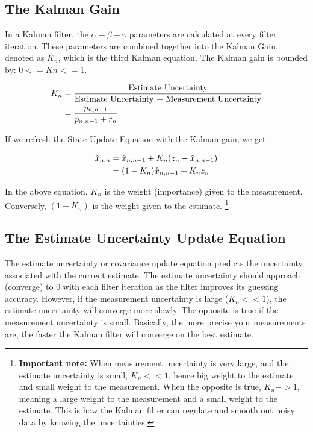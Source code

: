 \subsection{The Kalman Gain} In a Kalman filter, the $\alpha-\beta-\gamma$ parameters are calculated at every filter iteration.
These parameters are combined together into the Kalman Gain, denoted as $K_n$, which is the third Kalman equation.
The Kalman gain is bounded by: $0 <= Kn <= 1$.

\begin{equation} \labeq{kalman_gain}
    \begin{aligned}
        K_n &= \frac{\text{Estimate Uncertainty}}{\text{Estimate Uncertainty + Measurement Uncertainty}} \\
            &= \frac{p_{n,n-1}}{p_{n,n-1} + r_n}
    \end{aligned}
\end{equation}

If we refresh the State Update Equation with the Kalman gain, we get:

\begin{equation} \labeq{kalman_state_update}
    \begin{aligned}
        \hat{x}_{n,n} &= \hat{x}_{n,n-1} + K_n(z_n - \hat{x}_{n,n-1}) \\
                        &= (1-K_n)\hat{x}_{n,n-1} + K_n z_n \\
    \end{aligned}
\end{equation}

In the above equation, $K_n$ is the weight (importance) given to the measurement.
Conversely, $(1-K_n)$ is the weight given to the estimate. \footnote[1]{\textbf{Important note:} When measurement uncertainty is very large, and the estimate uncertainty is small, $K_n << 1$, hence big weight to the estimate and small weight to the measurement. When the opposite is true, $K_n -> 1$, meaning a large weight to the measurement and a small weight to the estimate. This is how the Kalman filter can regulate and smooth out noisy data by knowing the uncertainties.}

\subsection{The Estimate Uncertainty Update Equation} 
The estimate uncertainty or covariance update equation predicts the uncertainty associated with the current estimate.
The estimate uncertainty should approach (converge) to 0 with each filter iteration as the filter improves its guessing accuracy.
However, if the measurement uncertainty is large ($K_n << 1$), the estimate uncertainty will converge more slowly.
The opposite is true if the measurement uncertainty is small.
Basically, the more precise your measurements are, the faster the Kalman filter will converge on the best estimate.

